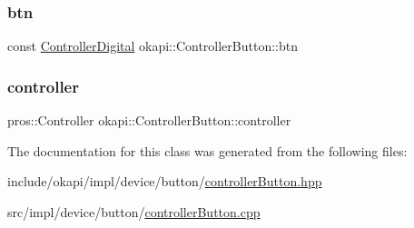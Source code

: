 \subsubsection{\texorpdfstring{btn}{btn}}
{\footnotesize\ttfamily const \mbox{\hyperlink{namespaceokapi_af5040b3f1f33d27698871423e1453ab6}{Controller\+Digital}} okapi\+::\+Controller\+Button\+::btn\hspace{0.3cm}{\ttfamily [protected]}}

\mbox{\label{classokapi_1_1ControllerButton_a7cbfbe335f633c6f7d12d12d51f0c830}} 
\subsubsection{\texorpdfstring{controller}{controller}}
{\footnotesize\ttfamily pros\+::\+Controller okapi\+::\+Controller\+Button\+::controller\hspace{0.3cm}{\ttfamily [protected]}}



The documentation for this class was generated from the following files\+:\begin{DoxyCompactItemize}
\item 
include/okapi/impl/device/button/\mbox{\hyperlink{controllerButton_8hpp}{controller\+Button.\+hpp}}\item 
src/impl/device/button/\mbox{\hyperlink{controllerButton_8cpp}{controller\+Button.\+cpp}}\end{DoxyCompactItemize}
